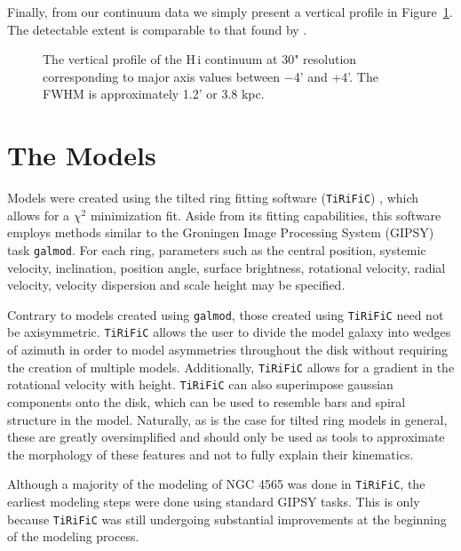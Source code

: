 \documentclass{emulateapj}
\begin{document}
\par
     Finally, from our continuum data we simply present a vertical profile in Figure~\ref{fig4}.  The detectable extent is comparable to that found by \citet{2008BASIP..25...67K}. 

\begin{figure}
\caption{The vertical profile of the {\sc H\,i} continuum at 30" resolution corresponding to major axis values between $-$4' and +4'.  The FWHM is approximately 1.2' or 3.8 kpc.  \label{fig4}}
\end{figure}



\section{The Models} \label{Section4}

\par
   Models were created using the tilted ring fitting software ({\tt TiRiFiC}) \citep{2007A&A...468..731J}\footnotemark{}, which allows for a ${\chi}^{2}$ minimization fit.  Aside from its fitting capabilities, this software employs methods similar to the Groningen Image Processing System (GIPSY) \citep{1992ASPC...25..131V} task {\tt galmod}.  For each ring, parameters such as the central position, systemic velocity, inclination, position angle, surface brightness, rotational velocity, radial velocity, velocity dispersion and scale height may be specified. 

\par
   Contrary to models created using {\tt galmod}, those created using {\tt TiRiFiC} need not be axisymmetric.  {\tt TiRiFiC} allows the user to divide the model galaxy into wedges of azimuth in order to model asymmetries throughout the disk without requiring the creation of multiple models. Additionally, {\tt TiRiFiC} allows for a gradient in the rotational velocity with height.  {\tt TiRiFiC} can also superimpose gaussian components onto the disk, which can be used to resemble bars and spiral structure in the model.  Naturally, as is the case for tilted ring models in general, these are greatly oversimplified and should only be used as tools to approximate the morphology of these features and not to fully explain their kinematics.  

\par
   Although a majority of the modeling of NGC 4565 was done in {\tt TiRiFiC}, the earliest modeling steps were done using standard GIPSY tasks.  This is only because {\tt TiRiFiC} was still undergoing substantial improvements at the beginning of the modeling process. 
\end{document}
